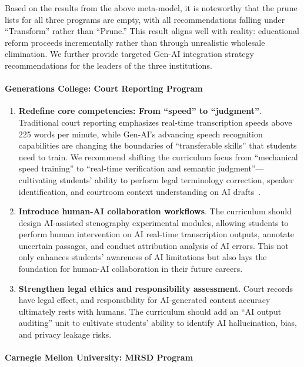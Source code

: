 Based on the results from the above meta-model, it is noteworthy that the prune lists for all three programs are empty, with all recommendations falling under ``Transform'' rather than ``Prune.'' This result aligns well with reality: educational reform proceeds incrementally rather than through unrealistic wholesale elimination. We further provide targeted Gen-AI integration strategy recommendations for the leaders of the three institutions.

\paragraph{Generations College: Court Reporting Program}

\begin{enumerate}[label=\roman*.]
    \item \textbf{Redefine core competencies: From ``speed'' to ``judgment''}. Traditional court reporting emphasizes real-time transcription speeds above 225 words per minute, while Gen-AI's advancing speech recognition capabilities are changing the boundaries of ``transferable skills'' that students need to train. We recommend shifting the curriculum focus from ``mechanical speed training'' to ``real-time verification and semantic judgment''---cultivating students' ability to perform legal terminology correction, speaker identification, and courtroom context understanding on AI drafts~\citep{mughal2025beyondautomationho}.
    \item \textbf{Introduce human-AI collaboration workflows}. The curriculum should design AI-assisted stenography experimental modules, allowing students to perform human intervention on AI real-time transcription outputs, annotate uncertain passages, and conduct attribution analysis of AI errors. This not only enhances students' awareness of AI limitations but also lays the foundation for human-AI collaboration in their future careers.
    \item \textbf{Strengthen legal ethics and responsibility assessment}. Court records have legal effect, and responsibility for AI-generated content accuracy ultimately rests with humans. The curriculum should add an ``AI output auditing'' unit to cultivate students' ability to identify AI hallucination, bias, and privacy leakage risks.
\end{enumerate}

\paragraph{Carnegie Mellon University: MRSD Program}

